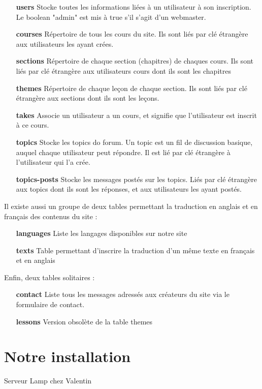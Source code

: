\documentclass[a4paper,10pt]{article}
\begin{document}
\begin{itemize}
\item[\textbf{users}] Stocke toutes les informations liées à un utilisateur à son inscription. Le boolean "admin" est mis à true s'il s'agit d'un webmaster.
\item[\textbf{courses}] Répertoire de tous les cours du site. Ils sont liés par clé étrangère aux utilisateurs les ayant crées.
\item[\textbf{sections}] Répertoire de chaque section (chapitres) de chaques cours. Ils sont liés par clé étrangère aux utilisateurs cours dont ils sont les chapitres
\item[\textbf{themes}] Répertoire de chaque leçon de chaque section. Ils sont liés par clé étrangère aux sections dont ils sont les leçons.
\item[\textbf{takes}] Associe un utilisateur a un cours, et signifie que l'utilisateur est inscrit à ce cours.
\item[\textbf{topics}] Stocke les topics do forum. Un topic est un fil de discussion basique, auquel chaque utilisateur peut répondre. Il est lié par clé étrangère à l'utilisateur qui l'a crée.
\item[\textbf{topics-posts}] Stocke les messages postés sur les topics. Liés par clé étrangère aux topics dont ils sont les réponses, et aux utilisateurs les ayant postés.
\end{itemize}

Il existe aussi un groupe de deux tables permettant la traduction en anglais et en français des contenus du site : 

\begin{itemize}
\item[\textbf{languages}] Liste les langages disponibles sur notre site
\item[\textbf{texts}] Table permettant d'inscrire la traduction d'un même texte en français et en anglais
\end{itemize}

Enfin, deux tables solitaires :

\begin{itemize}
\item[\textbf{contact}] Liste tous les messages adressés aux créateurs du site via le formulaire de contact.
\item[\textbf{lessons}] Version obsolète de la table themes
\end{itemize}
\newpage

\section{Notre installation}
Serveur Lamp chez Valentin
\end{document}
